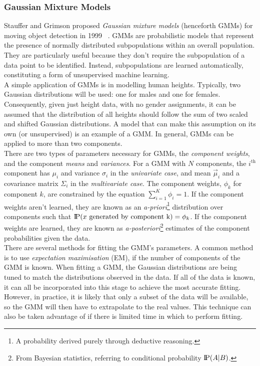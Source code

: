 \subsubsection{Gaussian Mixture Models}
\setlength{\leftskip}{0.5cm}
\indent \indent
Stauffer and Grimson proposed \textit{Gaussian mixture models} (henceforth GMMs) for moving object detection in 1999 ~\cite{Stauffer}. GMMs are probabilistic models that represent the presence of normally distributed subpopulations within an overall population. They are particularly useful because they don't require the subpopulation of a data point to be identified. Instead, subpopulations are learned automatically, constituting a form of unsupervised machine learning.
\smallskip \\ \indent
A simple application of GMMs is in modelling human heights. Typically, two Gaussian distributions will be used: one for males and one for females. Consequently, given just height data, with no gender assignments, it can be assumed that the distribution of all heights should follow the sum of two scaled and shifted Gaussian distributions. A model that can make this assumption on its own (or unsupervised) is an example of a GMM. In general, GMMs can be applied to more than two components.
\smallskip \\ \indent
There are two types of parameters necessary for GMMs, the \textit{component weights}, and the component \textit{means} and \textit{variances}. For a GMM with $N$ components, the $i^\text{th}$ component has $\mu_i$ and variance $\sigma_i$ in the \textit{univariate case}, and mean $\vec{\mu}_i$ and a covariance matrix $\Sigma_i$ in the \textit{multivariate case}. The component weights, $\phi_k$ for component $k$, are constrained by the equation $\sum^K_{i=1} \phi_i = 1$. If the component weights aren't learned, they are known as an \textit{a-priori}\footnote{A probability derived purely through deductive reasoning.} distribution over components such that $\text{I\kern-0.15em P}(x \text{ generated by component k}) = \phi_k$. If the component weights are learned, they are known as \textit{a-posteriori}\footnote{From Bayesian statistics, referring to conditional probability $\text{I\kern-0.15em P}(A | B)$.} estimates of the component probabilities given the data.
\smallskip \\ \indent
There are several methods for fitting the GMM's parameters. A common method is to use \textit{expectation maximisation} (EM), if the number of components of the GMM is known. When fitting a GMM, the Gaussian distributions are being tuned to match the distributions observed in the data. If all of the data is known, it can all be incorporated into this stage to achieve the most accurate fitting. However, in practice, it is likely that only a subset of the data will be available, so the GMM will then have to extrapolate to the real values. This technique can also be taken advantage of if there is limited time in which to perform fitting.
